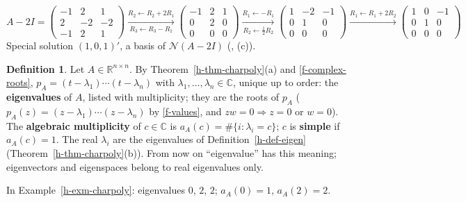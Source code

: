 \documentclass[12pt]{article}
\newcommand{\R}{\mathbb R}
\newcommand{\C}{\mathbb C}
\theoremstyle{definition}
\newtheorem{definition}[theorem]{Definition}
\begin{document}
\begin{board}[\(\lambda=2\): reduce \(A-2I\); a basis of \(\mathcal N(A-2I)\):]
\[
A-2I=\begin{pmatrix}-1&2&1\\2&-2&-2\\-1&2&1\end{pmatrix}
\xrightarrow[R_3\leftarrow R_3-R_1]{R_2\leftarrow R_2+2R_1}
\begin{pmatrix}-1&2&1\\0&2&0\\0&0&0\end{pmatrix}
\xrightarrow[R_2\leftarrow\frac12R_2]{R_1\leftarrow-R_1}
\begin{pmatrix}1&-2&-1\\0&1&0\\0&0&0\end{pmatrix}
\xrightarrow{R_1\leftarrow R_1+2R_2}
\begin{pmatrix}1&0&-1\\0&1&0\\0&0&0\end{pmatrix}
\]
Special solution \((1,0,1)'\), a basis of \(\mathcal N(A-2I)\) (, (c)).
\end{board}

\begin{definition}\label{h-def-eigenvalues}
Let \(A\in\R^{n\times n}\). By Theorem~\ref{h-thm-charpoly}(a) and \ref{f-complex-roots},
\(p_A=(t-\lambda_1)\cdots(t-\lambda_n)\) with \(\lambda_1,\dots,\lambda_n\in\C\), unique up to order: the
\textbf{eigenvalues} of \(A\), listed with multiplicity; they are the roots of \(p_A\) (\(p_A(z)=(z-\lambda_1)\cdots
(z-\lambda_n)\) by \ref{f-values}, and \(zw=0\Rightarrow z=0\) or \(w=0\)). The \textbf{algebraic
multiplicity} of \(c\in\C\) is \(a_A(c)=\#\{i:\lambda_i=c\}\); \(c\) is \textbf{simple} if \(a_A(c)=1\). The real
\(\lambda_i\) are the eigenvalues of Definition~\ref{h-def-eigen} (Theorem~\ref{h-thm-charpoly}(b)). From now on
``eigenvalue'' has this meaning; eigenvectors and eigenspaces belong to real eigenvalues only.
\end{definition}
In Example~\ref{h-exm-charpoly}: eigenvalues \(0\), \(2\), \(2\); \(a_A(0)=1\), \(a_A(2)=2\).
\end{document}
